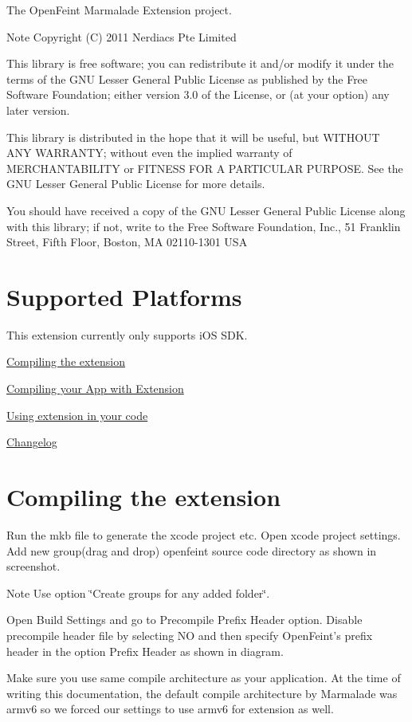 The OpenFeint Marmalade Extension project. \begin{DoxyNote}{Note}
Copyright (C) 2011 Nerdiacs Pte Limited

This library is free software; you can redistribute it and/or modify it under the terms of the GNU Lesser General Public License as published by the Free Software Foundation; either version 3.0 of the License, or (at your option) any later version.

This library is distributed in the hope that it will be useful, but WITHOUT ANY WARRANTY; without even the implied warranty of MERCHANTABILITY or FITNESS FOR A PARTICULAR PURPOSE. See the GNU Lesser General Public License for more details.

You should have received a copy of the GNU Lesser General Public License along with this library; if not, write to the Free Software Foundation, Inc., 51 Franklin Street, Fifth Floor, Boston, MA 02110-\/1301 USA
\end{DoxyNote}
\hypertarget{main_sec_1}{}\section{Supported Platforms}\label{main_sec_1}
This extension currently only supports iOS SDK.

\hyperlink{main_sec_2}{Compiling the extension}

\hyperlink{main_sec_3}{Compiling your App with Extension}

\hyperlink{main_sec_4}{Using extension in your code}

\hyperlink{main_sec_5}{Changelog}\hypertarget{main_sec_2}{}\section{Compiling the extension}\label{main_sec_2}
Run the mkb file to generate the xcode project etc. Open xcode project settings. Add new group(drag and drop) openfeint source code directory as shown in screenshot. \begin{DoxyNote}{Note}
Use option \char`\"{}Create groups for any added folder\char`\"{}.
\end{DoxyNote}
 Open Build Settings and go to Precompile Prefix Header option. Disable precompile header file by selecting NO and then specify OpenFeint's prefix header in the option Prefix Header as shown in diagram.



Make sure you use same compile architecture as your application. At the time of writing this documentation, the default compile architecture by Marmalade was armv6 so we forced our settings to use armv6 for extension as well.



